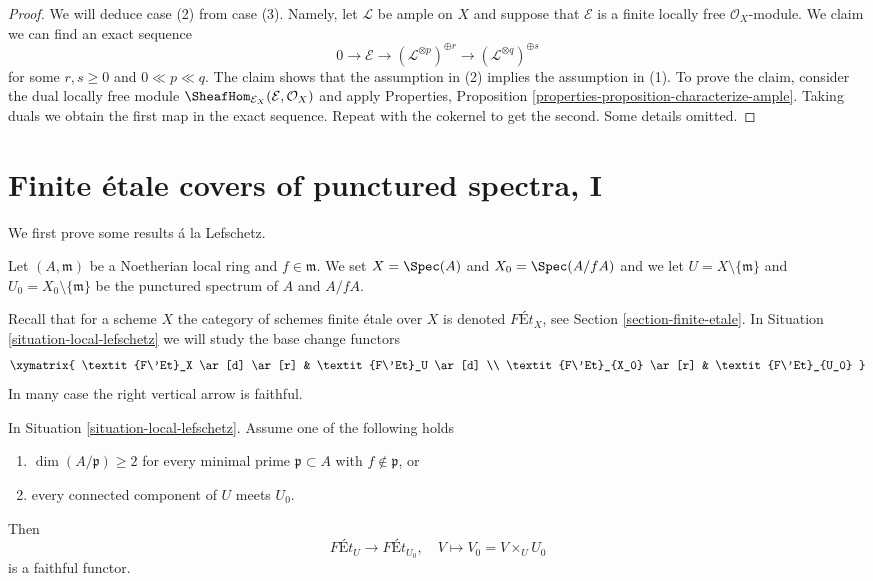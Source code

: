 \begin{proof}
\medskip\noindent
We will deduce case (2) from case (3). Namely, let $\mathcal{L}$ be ample
on $X$ and suppose that $\mathcal{E}$ is a
finite locally free $\mathcal{O}_X$-module.
We claim we can find an exact sequence
$$
0 \to \mathcal{E} \to
(\mathcal{L}^{\otimes p})^{\oplus r} \to
(\mathcal{L}^{\otimes q})^{\oplus s}
$$
for some $r, s \geq 0$ and $0 \ll p \ll q$.
The claim shows that the assumption in (2) implies the assumption in (1).
To prove the claim, consider the dual locally free module
$\SheafHom_{\mathcal{E}_X}(\mathcal{E}, \mathcal{O}_X)$
and apply
Properties, Proposition \ref{properties-proposition-characterize-ample}.
Taking duals we obtain the first map in the exact sequence.
Repeat with the cokernel to get the second. Some details omitted.
\end{proof}







\section{Finite \'etale covers of punctured spectra, I}
\label{section-pi1-punctured-spec}

\noindent
We first prove some results \'a la Lefschetz.

\begin{situation}
\label{situation-local-lefschetz}
Let $(A, \mathfrak m)$ be a Noetherian local ring and $f \in \mathfrak m$.
We set $X = \Spec(A)$ and $X_0 = \Spec(A/fA)$ and we
let $U = X \setminus \{\mathfrak m\}$ and
$U_0 = X_0 \setminus \{\mathfrak m\}$ be the punctured spectrum of
$A$ and $A/fA$.
\end{situation}

\noindent
Recall that for a scheme $X$ the category of schemes finite
\'etale over $X$ is denoted $\textit{F\'Et}_X$, see
Section \ref{section-finite-etale}.
In Situation \ref{situation-local-lefschetz}
we will study the base change functors
$$
\xymatrix{
\textit{F\'Et}_X \ar[d] \ar[r] & \textit{F\'Et}_U \ar[d] \\
\textit{F\'Et}_{X_0} \ar[r] & \textit{F\'Et}_{U_0}
}
$$
In many case the right vertical arrow is faithful.

\begin{lemma}
\label{lemma-faithful}
In Situation \ref{situation-local-lefschetz}.
Assume one of the following holds
\begin{enumerate}
\item $\dim(A/\mathfrak p) \geq 2$ for every minimal prime
$\mathfrak p \subset A$ with $f \not \in \mathfrak p$, or
\item every connected component of $U$ meets $U_0$.
\end{enumerate}
Then
$$
\textit{F\'Et}_U \longrightarrow \textit{F\'Et}_{U_0},\quad
V \longmapsto V_0 = V \times_U U_0
$$
is a faithful functor.
\end{lemma}

